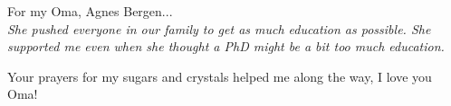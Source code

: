  
\begin{center}
	\Large
	For my Oma, Agnes Bergen...\\
	\textit{She pushed everyone in our family to get as much education as possible. She supported me even when she thought a PhD might be a bit too much education.} 

	Your prayers for my sugars and crystals helped me along the way, I love you Oma!
\end{center}